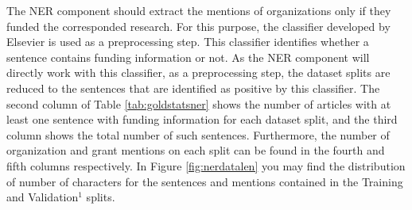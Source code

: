 \documentclass{report}
\theoremstyle{definition}
\theoremstyle{remark}
\begin{document}
The NER component should extract the mentions of organizations only if they funded the corresponded research. For this purpose, the classifier developed by Elsevier is used as a preprocessing step. This classifier identifies whether a sentence contains funding information or not. As the NER component will directly work with this classifier, as a preprocessing step, the dataset splits are reduced to the sentences that are identified as positive by this classifier. The second column of Table \ref{tab:goldstatsner} shows the number of articles with at least one sentence with funding information for each dataset split, and the third column shows the total number of such sentences. Furthermore, the number of organization and grant mentions on each split can be found in the fourth and fifth columns respectively. In Figure \ref{fig:nerdatalen} you may find the distribution of number of characters for the sentences and mentions contained in the Training and Validation$^1$ splits.
\end{document}
